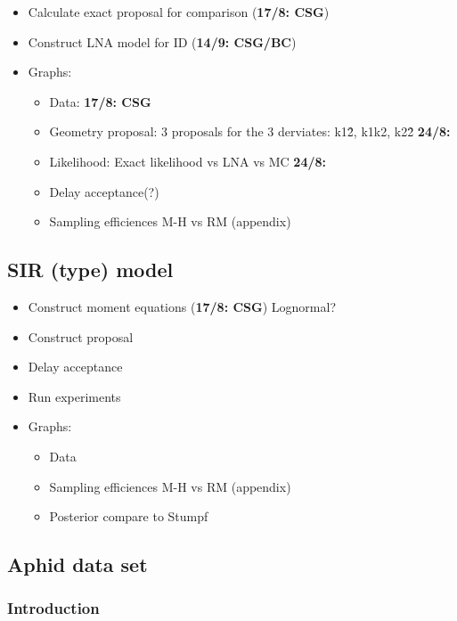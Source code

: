\documentclass{pnastwo}
\begin{document}
\begin{article}
  \begin{itemize}
  \item Calculate exact proposal for comparison (\textbf{17/8: CSG})
  \item Construct LNA model for ID (\textbf{14/9: CSG/BC})
  \item Graphs:
    \begin{itemize}
    \item Data: \textbf{17/8: CSG}
    \item Geometry proposal: 3 proposals for the 3 derviates: k1\^2, k1k2, k2\^2
      \textbf{24/8: }
    \item Likelihood: Exact likelihood vs LNA vs MC \textbf{24/8: }
    \item Delay acceptance(?)
    \item Sampling efficiences M-H vs RM (appendix)
    \end{itemize}
  \end{itemize} 
  
\subsection{SIR (type) model}


    \begin{itemize}
    \item Construct moment equations (\textbf{17/8: CSG}) Lognormal?
    \item Construct proposal
    \item Delay acceptance
    \item Run experiments
    \item Graphs:
      \begin{itemize}
      \item Data
      \item Sampling efficiences M-H vs RM (appendix)
      \item Posterior compare to Stumpf
      \end{itemize}
    \end{itemize}

\subsection{Aphid data set}

\subsubsection{Introduction}


\end{article}
\end{document}
